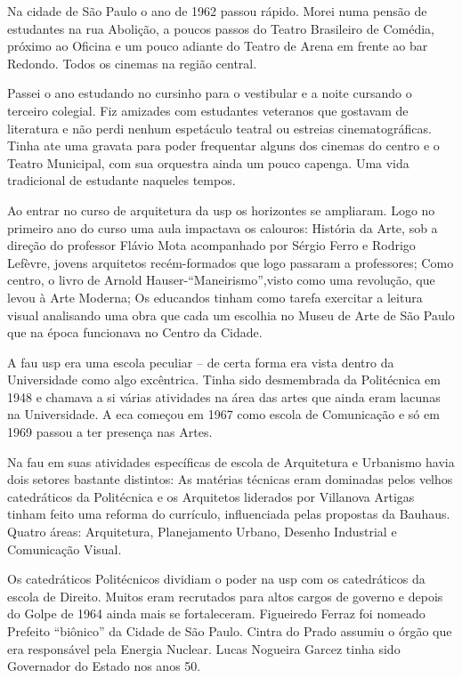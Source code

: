\subject{São Paulo e a {\cap fau}}

Na cidade de São Paulo o ano de 1962 passou rápido. Morei numa pensão de
estudantes na rua Abolição, a poucos passos do Teatro Brasileiro de
Comédia, próximo ao Oficina e um pouco adiante do Teatro de Arena em
frente ao bar Redondo. Todos os cinemas na região central.

Passei o ano estudando no cursinho para o vestibular e a noite cursando
o terceiro colegial. Fiz amizades com estudantes veteranos que gostavam
de literatura e não perdi nenhum espetáculo teatral ou estreias
cinematográficas. Tinha ate uma gravata para poder frequentar alguns dos
cinemas do centro e o Teatro Municipal, com sua orquestra ainda um pouco
capenga. Uma vida tradicional de estudante naqueles tempos.

Ao entrar no curso de arquitetura da {\sc usp} os horizontes se ampliaram.
Logo no primeiro ano do curso uma aula impactava os calouros: História
da Arte, sob a direção do professor Flávio Mota acompanhado por Sérgio
Ferro e Rodrigo Lefèvre, jovens arquitetos recém-formados que logo
passaram a professores; Como centro, o livro de Arnold
Hauser-“Maneirismo”,visto como uma revolução, que levou à Arte Moderna;
Os educandos tinham como tarefa exercitar a leitura visual analisando
uma obra que cada um escolhia no Museu de Arte de São Paulo que na época
funcionava no Centro da Cidade.

A {\sc fau usp} era uma escola peculiar -- de certa forma era vista dentro da
Universidade como algo excêntrica. Tinha sido desmembrada da Politécnica
em 1948 e chamava a si várias atividades na área das artes que ainda
eram lacunas na Universidade. A {\sc eca} começou em 1967 como escola de
Comunicação e só em 1969 passou a ter presença nas Artes.

Na {\sc fau} em suas atividades específicas de escola de Arquitetura e
Urbanismo havia dois setores bastante distintos: As matérias técnicas
eram dominadas pelos velhos catedráticos da Politécnica e os Arquitetos
liderados por Villanova Artigas tinham feito uma reforma do currículo,
influenciada pelas propostas da Bauhaus. Quatro áreas: Arquitetura,
Planejamento Urbano, Desenho Industrial e Comunicação Visual.

Os catedráticos Politécnicos dividiam o poder na {\sc usp} com os catedráticos
da escola de Direito. Muitos eram recrutados para altos cargos de
governo e depois do Golpe de 1964 ainda mais se fortaleceram. Figueiredo
Ferraz foi nomeado Prefeito “biônico” da Cidade de São Paulo. Cintra do
Prado assumiu o órgão que era responsável pela Energia Nuclear. Lucas
Nogueira Garcez tinha sido Governador do Estado nos anos 50.

